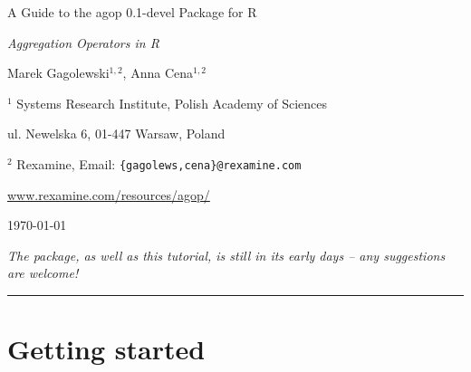 \documentclass[11pt]{article}\usepackage{graphicx, color}
\newcommand{\hlnumber}[1]{\textcolor[rgb]{0,0,0}{#1}}%
\newcommand{\hlfunctioncall}[1]{\textcolor[rgb]{0.501960784313725,0,0.329411764705882}{\textbf{#1}}}%
\newcommand{\hlstring}[1]{\textcolor[rgb]{0.6,0.6,1}{#1}}%
\newcommand{\hlkeyword}[1]{\textcolor[rgb]{0,0,0}{\textbf{#1}}}%
\newcommand{\hlargument}[1]{\textcolor[rgb]{0.690196078431373,0.250980392156863,0.0196078431372549}{#1}}%
\newcommand{\hlcomment}[1]{\textcolor[rgb]{0.180392156862745,0.6,0.341176470588235}{#1}}%
\newcommand{\hlroxygencomment}[1]{\textcolor[rgb]{0.43921568627451,0.47843137254902,0.701960784313725}{#1}}%
\newcommand{\hlformalargs}[1]{\textcolor[rgb]{0.690196078431373,0.250980392156863,0.0196078431372549}{#1}}%
\newcommand{\hleqformalargs}[1]{\textcolor[rgb]{0.690196078431373,0.250980392156863,0.0196078431372549}{#1}}%
\newcommand{\hlassignement}[1]{\textcolor[rgb]{0,0,0}{\textbf{#1}}}%
\newcommand{\hlpackage}[1]{\textcolor[rgb]{0.588235294117647,0.709803921568627,0.145098039215686}{#1}}%
\newcommand{\hlslot}[1]{\textit{#1}}%
\newcommand{\hlsymbol}[1]{\textcolor[rgb]{0,0,0}{#1}}%
\newcommand{\hlprompt}[1]{\textcolor[rgb]{0.2,0.2,0.2}{#1}}%
\newcommand{\package}[1]{\textsf{#1}\xspace}
\newcommand{\lang}[1]{\textsf{#1}\xspace}
\newcommand{\R}{\lang{R}}
\theoremstyle{remark}
\theoremstyle{definition}
\begin{document}
\begin{center}
{\LARGE\sf A Guide to the \package{agop} {0.1-devel} Package for \R}

{\large\sf\textit{Aggregation Operators in \R}}

\bigskip
{\large Marek Gagolewski${}^{1,2}$, Anna Cena${}^{1,2}$}

${}^{1}$ Systems Research Institute, Polish Academy of Sciences

ul. Newelska 6, 01-447 Warsaw, Poland

${}^{2}$ Rexamine, Email: \texttt{\{gagolews,cena\}@rexamine.com}

\href{http://www.rexamine.com/resources/agop/}%
{www.rexamine.com/resources/agop/}

\bigskip
\today


\medskip
\textit{The package, as well as this tutorial, is still in its early
days -- any suggestions are welcome!}
\end{center}





\bigskip\hrule\bigskip
\tableofcontents









\section{Getting started}
\end{document}
